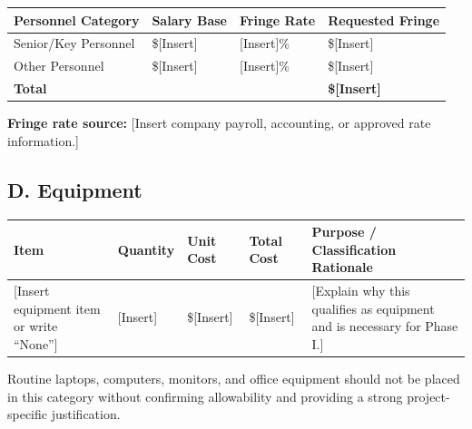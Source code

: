 \documentclass[11pt,letterpaper]{article}
\begin{document}
\begin{table}[htbp]
\centering
\renewcommand{\arraystretch}{1.25}
\begin{tabularx}{\textwidth}{
    X
    p{}
    p{}
    p{}
}
\toprule
\textbf{Personnel Category} &
\textbf{Salary Base} &
\textbf{Fringe Rate} &
\textbf{Requested Fringe} \\
\midrule

Senior/Key Personnel &
\$[Insert] &
[Insert]\% &
\$[Insert] \\

Other Personnel &
\$[Insert] &
[Insert]\% &
\$[Insert] \\

\midrule
\textbf{Total} &
&
&
\textbf{\$[Insert]} \\
\bottomrule
\end{tabularx}
\end{table}

\noindent
\textbf{Fringe rate source:}
[Insert company payroll, accounting, or approved rate information.]

\subsection*{D. Equipment}

\begin{table}[htbp]
\centering
\renewcommand{\arraystretch}{1.25}
\begin{tabularx}{\textwidth}{
    p{}
    p{}
    p{}
    p{}
    X
}
\toprule
\textbf{Item} &
\textbf{Quantity} &
\textbf{Unit Cost} &
\textbf{Total Cost} &
\textbf{Purpose / Classification Rationale} \\
\midrule

[Insert equipment item or write ``None''] &
[Insert] &
\$[Insert] &
\$[Insert] &
[Explain why this qualifies as equipment and is necessary for Phase I.] \\

\bottomrule
\end{tabularx}
\end{table}

\noindent
Routine laptops, computers, monitors, and office equipment should not be
placed in this category without confirming allowability and providing a
strong project-specific justification.

\end{document}

